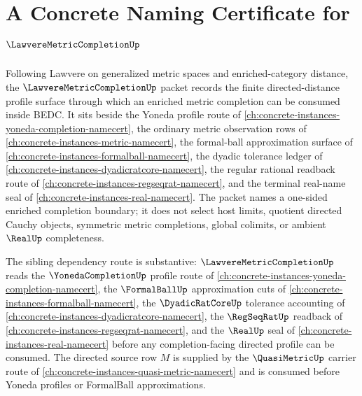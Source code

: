 \chapter{A Concrete Naming Certificate for $\LawvereMetricCompletionUp$}
\label{ch:concrete-instances-lawvere-metric-completion-namecert}

Following Lawvere on generalized metric spaces and enriched-category distance, the $\LawvereMetricCompletionUp$ packet records the finite directed-distance profile surface through which an enriched metric completion can be consumed inside BEDC. It sits beside the Yoneda profile route of \autoref{ch:concrete-instances-yoneda-completion-namecert}, the ordinary metric observation rows of \autoref{ch:concrete-instances-metric-namecert}, the formal-ball approximation surface of \autoref{ch:concrete-instances-formalball-namecert}, the dyadic tolerance ledger of \autoref{ch:concrete-instances-dyadicratcore-namecert}, the regular rational readback route of \autoref{ch:concrete-instances-regseqrat-namecert}, and the terminal real-name seal of \autoref{ch:concrete-instances-real-namecert}. The packet names a one-sided enriched completion boundary; it does not select host limits, quotient directed Cauchy objects, symmetric metric completions, global colimits, or ambient $\RealUp$ completeness.

The sibling dependency route is substantive: $\LawvereMetricCompletionUp$ reads the $\YonedaCompletionUp$ profile route of \autoref{ch:concrete-instances-yoneda-completion-namecert}, the $\FormalBallUp$ approximation cuts of \autoref{ch:concrete-instances-formalball-namecert}, the $\DyadicRatCoreUp$ tolerance accounting of \autoref{ch:concrete-instances-dyadicratcore-namecert}, the $\RegSeqRatUp$ readback of \autoref{ch:concrete-instances-regseqrat-namecert}, and the $\RealUp$ seal of \autoref{ch:concrete-instances-real-namecert} before any completion-facing directed profile can be consumed. The directed source row $M$ is supplied by the $\QuasiMetricUp$ carrier route of \autoref{ch:concrete-instances-quasi-metric-namecert} and is consumed before Yoneda profiles or FormalBall approximations.

